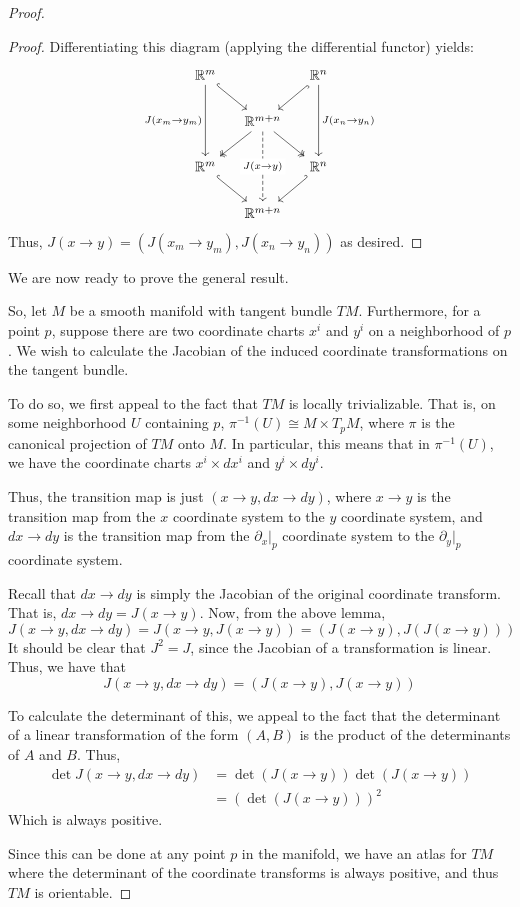 \documentclass[fontsize=11pt]{scrartcl} %
\numberwithin{equation}{section} %
\numberwithin{figure}{section} %
\numberwithin{table}{section} %
\newcommand{\R}{\mathbb{R}}
\begin{document}
\begin{proof}
\begin{proof}
Differentiating this diagram (applying the differential functor) yields:
\[
\begin{tikzcd}[column sep=small]
\R^m\arrow{dd}[swap]{J(x_m\to y_m)}\arrow[hook]{dr} &&\R^n\arrow{dd}{J(x_n\to y_n)}\arrow[hook]{dl}\\ 
&\R^{m+n}\arrow[dashed]{dd}[description]{J(x\to y)}\arrow[two heads]{dl}\arrow[two heads]{dr}&\\
\R^m\arrow[hook]{dr}&&\R^n\arrow[hook']{dl}\\
&\R^{m+n}
\end{tikzcd}
\]
Thus, $J(x\to y)=(J(x_m\to y_m),J(x_n\to y_n))$ as desired.
\end{proof}
We are now ready to prove the general result.

So, let $M$ be a smooth manifold with tangent bundle $TM$. Furthermore, for a point $p$,
suppose there are two coordinate charts $x^i$ and $y^i$ on a neighborhood of $p$. We wish
to calculate the Jacobian of the induced coordinate transformations on the tangent bundle.

To do so, we first appeal to the fact that $TM$ is locally trivializable. That is, on
some neighborhood $U$ containing $p$, $\pi^{-1}(U)\cong M\times T_pM$, where $\pi$ is the
canonical projection of $TM$ onto $M$. In particular, this means that in $\pi^{-1}(U)$,
we have the coordinate charts $x^i\times dx^i$ and $y^i\times dy^i$. 

Thus, the transition map is just $(x\to y,dx\to dy)$, where $x\to y$ is the transition map
from the $x$ coordinate system to the $y$ coordinate system, and $dx\to dy$ is the transition
map from the $\partial_{x}|_p$ coordinate system to the $\partial_y|_p$ coordinate system.

Recall that $dx\to dy$ is simply the Jacobian of the original coordinate transform. That is,
$dx\to dy = J(x\to y)$.
Now, from the above lemma, 
\[
J(x\to y,dx\to dy) = J(x\to y,J(x\to y)) = (J(x\to y),J(J(x\to y)))
\]
It should be clear that $J^2=J$, since the Jacobian of a transformation is linear. Thus,
we have that
\[
J(x\to y, dx\to dy) = (J(x\to y),J(x\to y))
\]

To calculate the determinant of this, we appeal to the fact that the determinant of
a linear transformation of the form $(A,B)$ is the product of the determinants of $A$ and $B$.
Thus,
\[
\begin{aligned}
\det J(x\to y,dx\to dy) &= \det(J(x\to y))\det(J(x\to y))\\
                        &= \left(\det(J(x\to y))\right)^2
\end{aligned}
\]
Which is always positive.

Since this can be done at any point $p$ in the manifold, we have an atlas for $TM$
where the determinant of the coordinate transforms is always positive, and thus
$TM$ is orientable.
\end{proof}
\newpage
\end{document}
